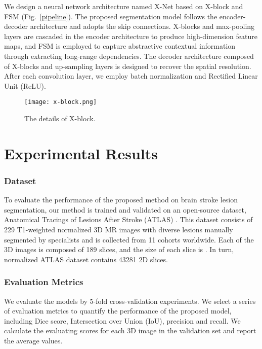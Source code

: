 \documentclass[runningheads]{llncs}
\begin{document}
We design a neural network architecture named X-Net based on X-block and FSM (Fig.~\ref{pipeline}). The proposed segmentation model follows the encoder-decoder architecture and adopts the skip connections. X-blocks and max-pooling layers are cascaded in the encoder architecture to produce high-dimension feature maps, and FSM is employed to capture abstractive contextual information through extracting long-range dependencies. The decoder architecture composed of X-blocks and up-sampling layers is designed to recover the spatial resolution. After each convolution layer, we employ batch normalization and Rectified Linear Unit (ReLU).

\begin{figure}
	\texttt{[image: x-block.png]}
	\caption{The details of X-block.} \label{x-block}
\end{figure}


\section{Experimental Results}
\subsubsection{Dataset}
To evaluate the performance of the proposed method on brain stroke lesion segmentation, our method is trained and validated on an open-source dataset, Anatomical Tracings of Lesions After Stroke (ATLAS) \cite{[2]}. This dataset consists of 229 T1-weighted normalized 3D MR images with diverse lesions manually segmented by specialists and is collected from 11 cohorts worldwide. Each of the 3D images is composed of 189 slices, and the size of each slice is . In turn, normalized ATLAS dataset contains 43281 2D slices.

\subsubsection{Evaluation Metrics}
We evaluate the models by 5-fold cross-validation experiments. We select a series of evaluation metrics to quantify the performance of the proposed model, including Dice score, Intersection over Union (IoU), precision and recall. We calculate the evaluating scores for each 3D image in the validation set and report the average values. 
\end{document}
